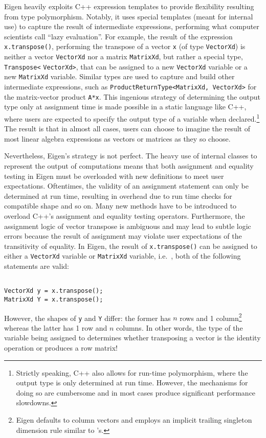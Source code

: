 Eigen heavily exploits C++ expression templates to provide flexibility
resulting from type polymorphism. Notably, it uses special templates (meant for
internal use) to capture the result of intermediate expressions, performing
what computer scientists call ``lazy evaluation''. For example, the result of
the expression \verb|x.transpose()|, performing the transpose of a vector
\verb|x| (of type \verb|VectorXd|) is neither a vector \verb|VectorXd| nor a
matrix \verb|MatrixXd|, but rather a special type, \verb|Transpose<|
\verb|VectorXd>|, that can be assigned to a new \verb|VectorXd| variable or a
new \verb|MatrixXd| variable. Similar types are used to capture and build other
intermediate expressions, such as \verb|ProductReturnType<MatrixXd, VectorXd>|
for the matrix-vector product \verb|A*x|.  This ingenious strategy of
determining the output type only at assignment time is made possible in a
static language like C++, where users are expected to specify the output type
of a variable when declared.\footnote{Strictly speaking, C++ also allows for
run-time polymorphism, where the output type is only determined at run time.
However, the mechanisms for doing so are cumbersome and in most cases produce
significant performance slowdowns.} The result is that in almost all cases,
users can choose to imagine the result of most linear algebra expressions as
vectors or matrices as they so choose.

Nevertheless, Eigen's strategy is not perfect. The heavy use of internal
classes to represent the output of computations means that both assignment and
equality testing in Eigen must be overloaded with new definitions to meet user
expectations. Oftentimes, the validity of an assignment statement can only be
determined at run time, resulting in overhead due to run time checks for
compatible shape and so on. Many new methods have to be introduced to overload
C++'s assignment and equality testing operators. Furthermore, the assignment
logic of vector transpose is ambiguous and may lead to subtle logic errors
because the result of assignment may violate user expectations of the
transitivity of equality. In Eigen, the result of \verb|x.transpose()| can be
assigned to either a \verb|VectorXd| variable or \verb|MatrixXd| variable,
i.e.\ , both of the following statements are valid:

\begin{verbatim}

VectorXd y = x.transpose();
MatrixXd Y = x.transpose();

\end{verbatim}
%
However, the shapes of \verb|y| and \verb|Y| differ: the former has $n$ rows and 1 column\footnote{Eigen defaults to column vectors and employs an implicit trailing singleton dimension rule similar to 's.} whereas the latter has 1 row and $n$ columns. In other words, the type of the variable being assigned to determines whether transposing a vector is the identity operation or produces a row matrix!

